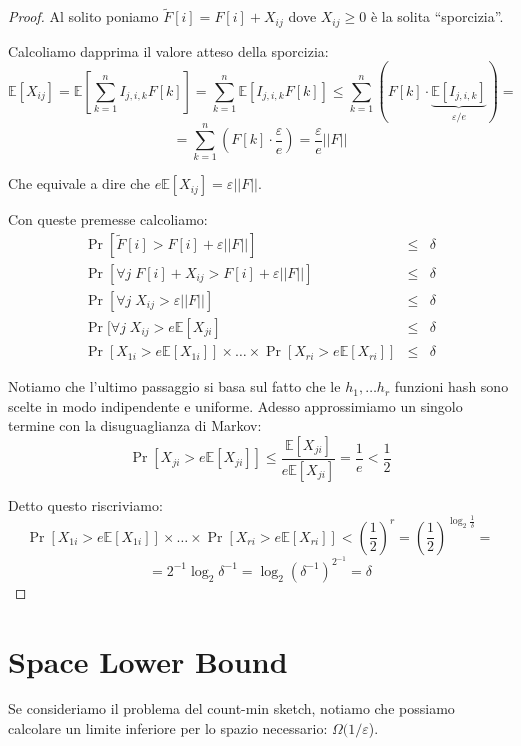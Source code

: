 \documentclass[a4paper,11pt]{book}
\begin{document}
\begin{proof}
Al solito poniamo $\tilde{F}[i] = F[i] + X_{ij}$ dove $X_{ij} \geq 0$ \`e la solita ``sporcizia''.

Calcoliamo dapprima il valore atteso della sporcizia: 
$$\mathbb{E}[X_{ij}] = \mathbb{E}\left[\sum_{k=1}^{n} I_{j,i,k} F[k]\right] = \sum_{k=1}^{n} \mathbb{E}\left[I_{j,i,k} F[k]\right] \leq \sum_{k=1}^{n}\left(F[k] \cdot \underbrace{\mathbb{E}\left[I_{j,i,k}\right]}_{\varepsilon /e} \right) = $$
$$= \sum_{k=1}^{n}(F[k] \cdot \frac{\varepsilon}{e}) = \frac{\varepsilon}{e}||F||$$

Che equivale a dire che $e \mathbb{E}[X_{ij}] = \varepsilon ||F||$.

Con queste premesse calcoliamo:
\begin{eqnarray}
 \Pr[\tilde{F}[i] > F[i] + \varepsilon ||F||] & \leq & \delta \nonumber \\
 \Pr[\forall j \; F[i] + X_{ij} > F[i] + \varepsilon ||F||] & \leq & \delta \nonumber \\
 \Pr[\forall j \; X_{ij} > \varepsilon ||F||] & \leq & \delta \nonumber \\
 \Pr[\forall j \; X_{ij} > e \mathbb{E}[X_{ji}] & \leq & \delta \nonumber \\
 \Pr[X_{1i} > e \mathbb{E}[X_{1i}]] \times \ldots \times \Pr[X_{ri} > e \mathbb{E}[X_{ri}]] & \leq & \delta \nonumber 
\end{eqnarray}

Notiamo che l'ultimo passaggio si basa sul fatto che le $h_1, \ldots h_r$ funzioni hash sono scelte in modo indipendente e uniforme. Adesso approssimiamo un singolo termine con la disuguaglianza di Markov: $$\Pr[X_{ji} > e \mathbb{E}[X_{ji}]] \leq \frac{\mathbb{E}[X_{ji}]}{e \mathbb{E}[X_{ji}]} = \frac{1}{e} < \frac{1}{2} $$ 

Detto questo riscriviamo: $$ \Pr[X_{1i} > e \mathbb{E}[X_{1i}]] \times \ldots \times \Pr[X_{ri} > e \mathbb{E}[X_{ri}]] < \left(\frac{1}{2} \right)^r = \left(\frac{1}{2}\right)^{\log_2 \frac{1}{\delta}} = $$
$$ =  2^{-1} \log_{2} \delta^{-1} = \log_2 (\delta^{-1})^{2^{-1}} = \delta$$
\end{proof}

\section{Space Lower Bound}

Se consideriamo il problema del count-min sketch, notiamo che possiamo calcolare un limite inferiore per lo spazio necessario: $\Omega(1/\varepsilon$).
\end{document}
